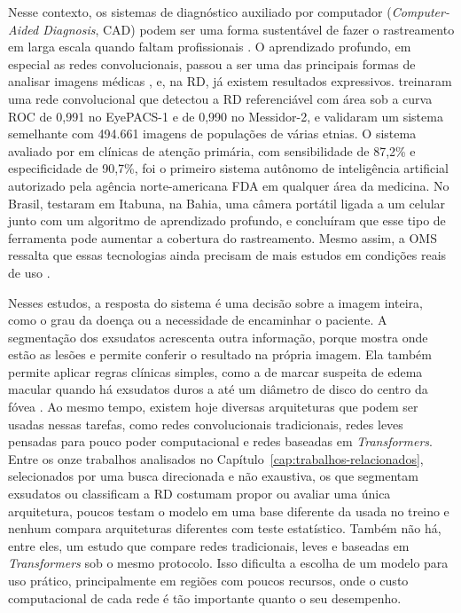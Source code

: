 Nesse contexto, os sistemas de diagnóstico auxiliado por computador (\textit{Computer-Aided Diagnosis}, CAD) podem ser uma forma sustentável de fazer o rastreamento em larga escala quando faltam profissionais \cite{porwal2020idrid}. O aprendizado profundo, em especial as redes convolucionais, passou a ser uma das principais formas de analisar imagens médicas \cite{litjens2017survey}, e, na RD, já existem resultados expressivos.  treinaram uma rede convolucional que detectou a RD referenciável com área sob a curva ROC de 0,991 no EyePACS-1 e de 0,990 no Messidor-2, e  validaram um sistema semelhante com 494.661 imagens de populações de várias etnias. O sistema avaliado por  em clínicas de atenção primária, com sensibilidade de 87,2\% e especificidade de 90,7\%, foi o primeiro sistema autônomo de inteligência artificial autorizado pela agência norte-americana FDA em qualquer área da medicina. No Brasil,  testaram em Itabuna, na Bahia, uma câmera portátil ligada a um celular junto com um algoritmo de aprendizado profundo, e concluíram que esse tipo de ferramenta pode aumentar a cobertura do rastreamento. Mesmo assim, a OMS ressalta que essas tecnologias ainda precisam de mais estudos em condições reais de uso \cite[p.~75]{who2019vision}.

Nesses estudos, a resposta do sistema é uma decisão sobre a imagem inteira, como o grau da doença ou a necessidade de encaminhar o paciente. A segmentação dos exsudatos acrescenta outra informação, porque mostra onde estão as lesões e permite conferir o resultado na própria imagem. Ela também permite aplicar regras clínicas simples, como a de marcar suspeita de edema macular quando há exsudatos duros a até um diâmetro de disco do centro da fóvea \cite{krause2018grader}. Ao mesmo tempo, existem hoje diversas arquiteturas que podem ser usadas nessas tarefas, como redes convolucionais tradicionais, redes leves pensadas para pouco poder computacional e redes baseadas em \textit{Transformers}. Entre os onze trabalhos analisados no Capítulo~\ref{cap:trabalhos-relacionados}, selecionados por uma busca direcionada e não exaustiva, os que segmentam exsudatos ou classificam a RD costumam propor ou avaliar uma única arquitetura, poucos testam o modelo em uma base diferente da usada no treino e nenhum compara arquiteturas diferentes com teste estatístico. Também não há, entre eles, um estudo que compare redes tradicionais, leves e baseadas em \textit{Transformers} sob o mesmo protocolo. Isso dificulta a escolha de um modelo para uso prático, principalmente em regiões com poucos recursos, onde o custo computacional de cada rede é tão importante quanto o seu desempenho.

